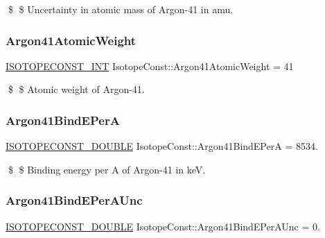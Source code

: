\$ \$ Uncertainty in atomic mass of Argon-\/41 in amu. \mbox{\label{group___isotope_const-_argon-_ar41_ga0d72a8348773ac3bad0d423cb36c96b0}} 
\subsubsection{\texorpdfstring{Argon41\+Atomic\+Weight}{Argon41AtomicWeight}}
{\footnotesize\ttfamily \mbox{\hyperlink{group___isotope_const-_macros_ga5f18360b3e99483a35c32d789e62621c}{I\+S\+O\+T\+O\+P\+E\+C\+O\+N\+S\+T\+\_\+\+I\+NT}} Isotope\+Const\+::\+Argon41\+Atomic\+Weight = 41}

\$ \$ Atomic weight of Argon-\/41. \mbox{\label{group___isotope_const-_argon-_ar41_ga5804a477d28f69c9909ecc43436450cb}} 
\subsubsection{\texorpdfstring{Argon41\+Bind\+E\+PerA}{Argon41BindEPerA}}
{\footnotesize\ttfamily \mbox{\hyperlink{group___isotope_const-_macros_ga8f45a7272ce02c0b4c65c44636ed719a}{I\+S\+O\+T\+O\+P\+E\+C\+O\+N\+S\+T\+\_\+\+D\+O\+U\+B\+LE}} Isotope\+Const\+::\+Argon41\+Bind\+E\+PerA = 8534.}

\$ \$ Binding energy per A of Argon-\/41 in keV. \mbox{\label{group___isotope_const-_argon-_ar41_gabe0ad69e1b1f81a239122c8b2a5b34b6}} 
\subsubsection{\texorpdfstring{Argon41\+Bind\+E\+Per\+A\+Unc}{Argon41BindEPerAUnc}}
{\footnotesize\ttfamily \mbox{\hyperlink{group___isotope_const-_macros_ga8f45a7272ce02c0b4c65c44636ed719a}{I\+S\+O\+T\+O\+P\+E\+C\+O\+N\+S\+T\+\_\+\+D\+O\+U\+B\+LE}} Isotope\+Const\+::\+Argon41\+Bind\+E\+Per\+A\+Unc = 0.}

